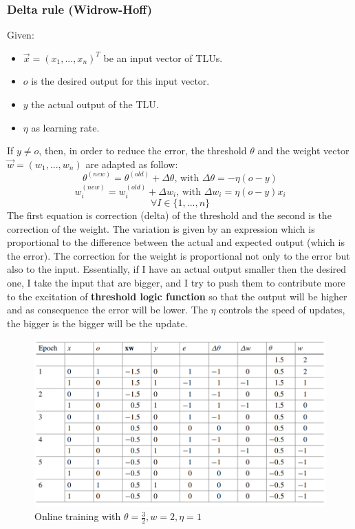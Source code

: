 \documentclass{article}
\begin{document}
\subsubsection{Delta rule (Widrow-Hoff)}
Given:
\begin{itemize}
    \item $\vec{x}=(x_1,...,x_n)^T$ be an input vector of TLUs.
    \item $o$ is the desired output for this input vector.
    \item $y$ the actual output of the TLU.
    \item $\eta$ as learning rate.
\end{itemize}
If $y\neq o$, then, in order to reduce the error, the threshold $\theta$ and the weight
vector $\vec{w}=(w_1,...,w_n)$ are adapted as follow:
$$\theta^{(new)}=\theta^{(old)}+\Delta\theta\text{, with }\Delta\theta=-\eta (o-y)$$
$$w_i^{(new)}=w_i^{(old)}+\Delta w_i\text{, with }\Delta w_i = \eta (o-y)x_i$$
$$\forall I \in \{1,...,n\}$$
The first equation is correction (delta) of the threshold and the second is the correction of the
weight. The variation is given by an expression which is proportional to the difference
between the actual and expected output (which is the error).
\newline\newline
The correction for the weight is proportional not only to the error but also to the input.
Essentially, if I have an actual output smaller then the desired one, I take the input
that are bigger, and I try to push them to contribute more to the excitation
of \textbf{threshold logic function} so that the output will be higher and as
consequence the error will be lower.
\newline\newline
The $\eta$ controls the speed of updates, the bigger is the bigger will be the update.
\begin{figure}[H]
    \centering
    \includegraphics[scale=0.5]{images/online_training.png}
    \caption{Online training with $\theta = \frac{3}{2},w=2,\eta =1$}
\end{figure}
\end{document}
